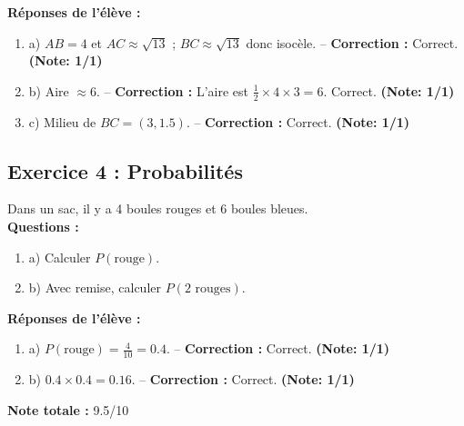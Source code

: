 \documentclass{article}
\begin{document}
\textbf{Réponses de l’élève :}
\begin{enumerate}
    \item a) $AB = 4$ et $AC \approx \sqrt{13}$ ; $BC \approx \sqrt{13}$ donc isocèle. -- \textbf{Correction :} Correct. \textbf{(Note: 1/1)}
    \item b) Aire $\approx 6$. -- \textbf{Correction :} L’aire est $\frac{1}{2} \times 4 \times 3 = 6$. Correct. \textbf{(Note: 1/1)}
    \item c) Milieu de $BC = (3, 1.5)$. -- \textbf{Correction :} Correct. \textbf{(Note: 1/1)}
\end{enumerate}

\subsection*{Exercice 4 : Probabilités}
Dans un sac, il y a 4 boules rouges et 6 boules bleues. \\
\textbf{Questions :}
\begin{enumerate}
    \item a) Calculer $P(\text{rouge})$.
    \item b) Avec remise, calculer $P(2 \text{ rouges})$.
\end{enumerate}

\textbf{Réponses de l’élève :}
\begin{enumerate}
    \item a) $P(\text{rouge}) = \frac{4}{10} = 0.4$. -- \textbf{Correction :} Correct. \textbf{(Note: 1/1)}
    \item b) $0.4 \times 0.4 = 0.16$. -- \textbf{Correction :} Correct. \textbf{(Note: 1/1)}
\end{enumerate}

\textbf{Note totale :} 9.5/10
\end{document}
